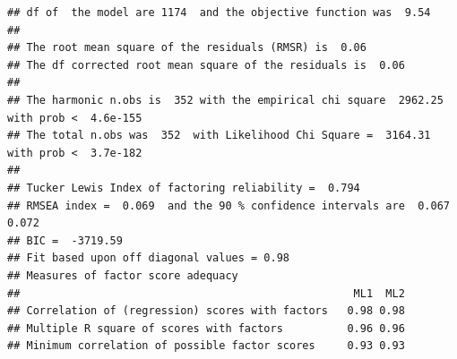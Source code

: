 \documentclass[
  man]{apa6}
\begin{document}
\begin{verbatim}
## df of  the model are 1174  and the objective function was  9.54 
## 
## The root mean square of the residuals (RMSR) is  0.06 
## The df corrected root mean square of the residuals is  0.06 
## 
## The harmonic n.obs is  352 with the empirical chi square  2962.25  with prob <  4.6e-155 
## The total n.obs was  352  with Likelihood Chi Square =  3164.31  with prob <  3.7e-182 
## 
## Tucker Lewis Index of factoring reliability =  0.794
## RMSEA index =  0.069  and the 90 % confidence intervals are  0.067 0.072
## BIC =  -3719.59
## Fit based upon off diagonal values = 0.98
## Measures of factor score adequacy             
##                                                    ML1  ML2
## Correlation of (regression) scores with factors   0.98 0.98
## Multiple R square of scores with factors          0.96 0.96
## Minimum correlation of possible factor scores     0.93 0.93
\end{verbatim}
\end{document}
